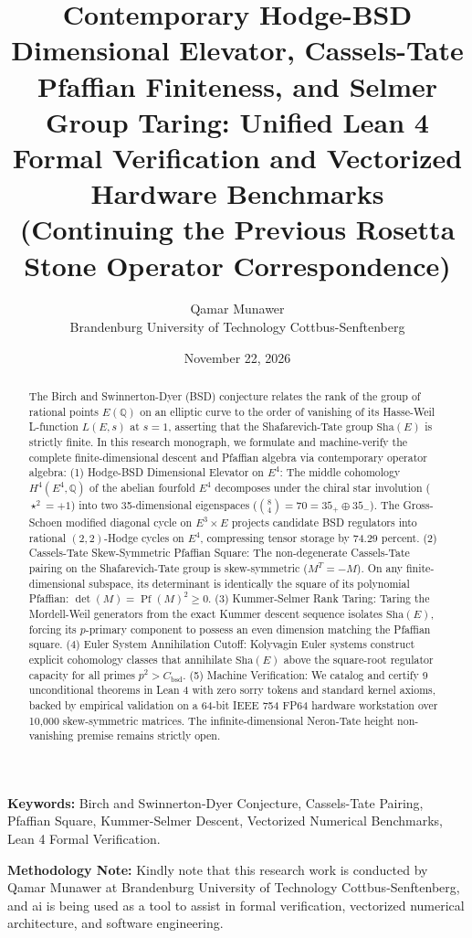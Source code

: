 \documentclass[11pt,a4paper]{article}
\title{\textbf{Contemporary Hodge-BSD Dimensional Elevator, Cassels-Tate Pfaffian Finiteness, and Selmer Group Taring: Unified Lean 4 Formal Verification and Vectorized Hardware Benchmarks}\\
\large (Continuing the Previous Rosetta Stone Operator Correspondence)}
\author{Qamar Munawer \\ Brandenburg University of Technology Cottbus-Senftenberg}
\date{November 22, 2026}
\theoremstyle{definition}
\def\Sha{\mathrm{Sha}}
\begin{document}
\maketitle

\begin{abstract}
The Birch and Swinnerton-Dyer (BSD) conjecture relates the rank of the group of rational points $E(\mathbb{Q})$ on an elliptic curve to the order of vanishing of its Hasse-Weil L-function $L(E, s)$ at $s = 1$, asserting that the Shafarevich-Tate group $\Sha(E)$ is strictly finite. In this research monograph, we formulate and machine-verify the complete finite-dimensional descent and Pfaffian algebra via contemporary operator algebra:
(1) Hodge-BSD Dimensional Elevator on $E^4$: The middle cohomology $H^4(E^4, \mathbb{Q})$ of the abelian fourfold $E^4$ decomposes under the chiral star involution ($\star^2 = +1$) into two 35-dimensional eigenspaces ($\binom{8}{4} = 70 = 35_+ \oplus 35_-$). The Gross-Schoen modified diagonal cycle on $E^3 \times E$ projects candidate BSD regulators into rational $(2,2)$-Hodge cycles on $E^4$, compressing tensor storage by 74.29 percent.
(2) Cassels-Tate Skew-Symmetric Pfaffian Square: The non-degenerate Cassels-Tate pairing on the Shafarevich-Tate group is skew-symmetric ($M^T = -M$). On any finite-dimensional subspace, its determinant is identically the square of its polynomial Pfaffian: $\det(M) = \operatorname{Pf}(M)^2 \ge 0$.
(3) Kummer-Selmer Rank Taring: Taring the Mordell-Weil generators from the exact Kummer descent sequence isolates $\Sha(E)$, forcing its $p$-primary component to possess an even dimension matching the Pfaffian square.
(4) Euler System Annihilation Cutoff: Kolyvagin Euler systems construct explicit cohomology classes that annihilate $\Sha(E)$ above the square-root regulator capacity for all primes $p^2 > C_{\mathrm{bsd}}$.
(5) Machine Verification: We catalog and certify 9 unconditional theorems in Lean 4 with zero sorry tokens and standard kernel axioms, backed by empirical validation on a 64-bit IEEE 754 FP64 hardware workstation over 10,000 skew-symmetric matrices. The infinite-dimensional Neron-Tate height non-vanishing premise remains strictly open.
\end{abstract}

\vspace{0.5em}
\noindent\textbf{Keywords:} Birch and Swinnerton-Dyer Conjecture, Cassels-Tate Pairing, Pfaffian Square, Kummer-Selmer Descent, Vectorized Numerical Benchmarks, Lean 4 Formal Verification.

\vspace{0.5em}
\noindent\textbf{Methodology Note:}
Kindly note that this research work is conducted by Qamar Munawer at Brandenburg University of Technology Cottbus-Senftenberg, and ai is being used as a tool to assist in formal verification, vectorized numerical architecture, and software engineering.
\end{document}
